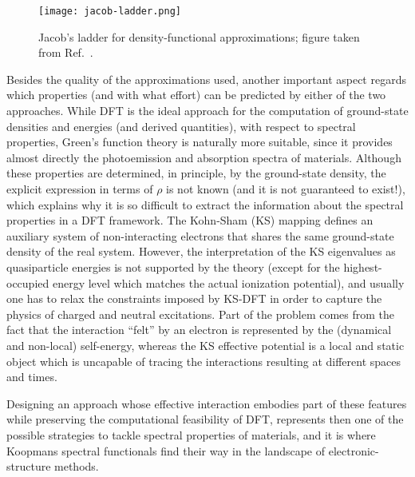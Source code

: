 \begin{figure}
    \centering
    \texttt{[image: jacob-ladder.png]}
    \caption[Jacob's ladder for density-functional approximations]{Jacob's ladder for density-functional approximations; figure taken from Ref.~\cite{perdew_jacobs_2001}.}
    \label{fig:jacob-ladder}
\end{figure}

Besides the quality of the approximations used, another important aspect regards which properties (and with what effort) can be predicted by either of the two approaches. While DFT is the ideal approach for the computation of ground-state densities and energies (and derived quantities), with respect to spectral properties, Green's function theory is naturally more suitable, since it provides almost directly the photoemission and absorption spectra of materials. Although these properties are determined, in principle, by the ground-state density, the explicit expression in terms of $\rho$ is not known (and it is not guaranteed to exist!), which explains why it is so difficult to extract the information about the spectral properties in a DFT framework. The Kohn-Sham (KS) mapping defines an auxiliary system of non-interacting electrons that shares the same ground-state density of the real system. However, the interpretation of the KS eigenvalues as quasiparticle energies is not supported by the theory (except for the highest-occupied energy level which matches the actual ionization potential), and usually one has to relax the constraints imposed by KS-DFT in order to capture the physics of charged and neutral excitations. Part of the problem comes from the fact that the interaction ``felt'' by an electron is represented by the (dynamical and non-local) self-energy, whereas the KS effective potential is a local and static object which is uncapable of tracing the interactions resulting at different spaces and times.

Designing an approach whose effective interaction embodies part of these features while preserving the computational feasibility of DFT, represents then one of the possible strategies to tackle spectral properties of materials, and it is where Koopmans spectral functionals find their way in the landscape of electronic-structure methods.

